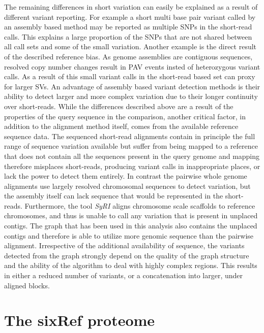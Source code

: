 The remaining differences in short variation can easily be explained as a result of different variant reporting. For example a short multi base pair variant called by an assembly based method may be reported as multiple SNPs in the short-read calls. This explains a large proportion of the SNPs that are not shared between all call sets and some of the small variation. Another example is the direct result of the described reference bias. As genome assemblies are contiguous sequences, resolved copy number changes result in PAV events insted of heterozygous variant calls. As a result of this small variant calls in the short-read based set can proxy for larger SVs. An advantage of assembly based variant detection methods is their ability to detect larger and more complex variation due to their longer continuity over short-reads. While the differences described above are a result of the properties of the query sequence in the comparison, another critical factor, in addition to the alignment method itself, comes from the available reference sequence data. The sequenced short-read alignments contain in principle the full range of sequence variation available but suffer from being mapped to a reference that does not contain all the sequences present in the query genome and mapping therefore misplaces short-reads, producing variant calls in inappropriate places, or lack the power to detect them entirely. In contrast the pairwise whole genome alignments use largely resolved chromosomal sequences to detect variation, but the assembly itself can lack sequence that would be represented in the short-reads. Furthermore, the tool \textit{SyRI} aligns chromosome scale scaffolds to reference chromosomes, and thus is unable to call any variation that is present in unplaced contigs. The graph that has been used in this analysis also contains the unplaced contigs and therefore is able to utilize more genomic sequence than the pairwise alignment. Irrespective of the additional availability of sequence, the variants detected from the graph strongly depend on the quality of the graph structure and the ability of the algorithm to deal with highly complex regions. This results in either a reduced number of variants, or a concatenation into larger, under aligned blocks.

\section{The sixRef proteome}
\label{sec:theSixRefProteome}

